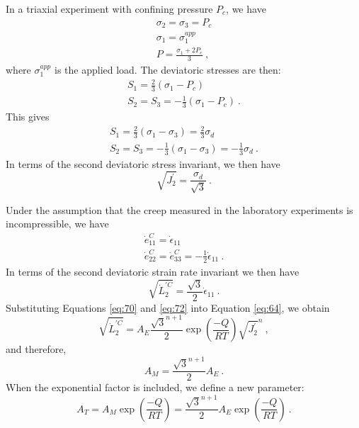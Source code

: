 In a triaxial experiment with confining pressure $P_{c}$, we have
\begin{gather}
\sigma_{2}=\sigma_{3}=P_{c}\nonumber \\
\sigma_{1}=\sigma_{1}^{app}\label{eq:67}\\
P=\frac{\sigma_{1}+2P_{c}}{3}\:,\nonumber 
\end{gather}
where $\sigma_{1}^{app}$ is the applied load. The deviatoric stresses
are then:
\begin{gather}
S_{1}=\frac{2}{3}\left(\sigma_{1}-P_{c}\right)\nonumber \\
S_{2}=S_{3}=-\frac{1}{3}\left(\sigma_{1}-P_{c}\right)\:.\label{eq:68}
\end{gather}
This gives
\begin{gather}
S_{1}=\frac{2}{3}\left(\sigma_{1}-\sigma_{3}\right)=\frac{2}{3}\sigma_{d}\nonumber \\
S_{2}=S_{3}=-\frac{1}{3}\left(\sigma_{1}-\sigma_{3}\right)=-\frac{1}{3}\sigma_{d}\:.\label{eq:69}
\end{gather}
In terms of the second deviatoric stress invariant, we then have
\begin{equation}
\sqrt{J_{2}^{\prime}}=\frac{\sigma_{d}}{\sqrt{3}}\:.\label{eq:70}
\end{equation}

Under the assumption that the creep measured in the laboratory experiments
is incompressible, we have
\begin{gather}
\dot{e}_{11}^{C}=\dot{\epsilon}_{11}\nonumber \\
\dot{e}_{22}^{C}=\dot{e}_{33}^{C}=-\frac{1}{2}\dot{\epsilon}_{11}\:.\label{eq:71}
\end{gather}
In terms of the second deviatoric strain rate invariant we then have
\begin{equation}
\sqrt{\dot{L}_{2}^{\prime C}}=\frac{\sqrt{3}}{2}\dot{\epsilon}_{11}\:.\label{eq:72}
\end{equation}
Substituting Equations \vref{eq:70} and \vref{eq:72} into Equation
\vref{eq:64}, we obtain
\begin{equation}
\sqrt{\dot{L}_{2}^{\prime C}}=A_{E}\frac{\sqrt{3}^{n+1}}{2}\exp\left(\frac{-Q}{RT}\right)\sqrt{J_{2}^{\prime}}^{n}\:,\label{eq:73}
\end{equation}
and therefore,
\begin{equation}
A_{M}=\frac{\sqrt{3}^{n+1}}{2}A_{E}\:.\label{eq:74}
\end{equation}
When the exponential factor is included, we define a new parameter:
\begin{equation}
A_{T}=A_{M}\exp\left(\frac{-Q}{RT}\right)=\frac{\sqrt{3}^{n+1}}{2}A_{E}\exp\left(\frac{-Q}{RT}\right)\:.\label{eq:75}
\end{equation}

